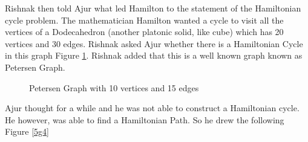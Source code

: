 Rishnak then told Ajur what led Hamilton to the statement of the Hamiltonian cycle problem. The mathematician Hamilton wanted a cycle to visit 
all the vertices of a Dodecahedron (another platonic solid, like cube) which has 20 vertices and 30 edges. 
Rishnak asked Ajur whether there is a Hamiltonian Cycle in this graph Figure \ref{5g3}. Rishnak added that this is a well known graph known as Petersen Graph.

\begin{figure}
\begin{center}
\caption{ Petersen Graph with 10 vertices and 15 edges }\label{5g3}
\end{center}
\end{figure}
Ajur thought for a while and he was not able to construct a Hamiltonian cycle. He however, was able to find a 
Hamiltonian Path. So he drew the following Figure \ref{5g4}


